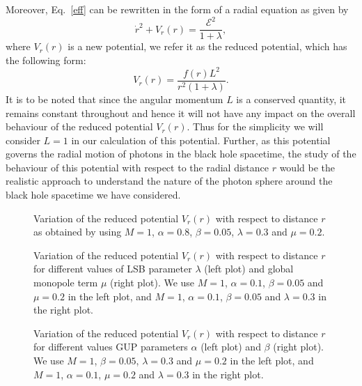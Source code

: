 \documentclass[aps,amsmath,amssymb,showpacs,showkeys]{revtex4}
\begin{document}
Moreover, Eq.\ \eqref{eff} can be rewritten in the form of a radial equation
as given by
\begin{equation}
\dot{r}^2 + V_r(r) = \frac{\mathcal{E}^2}{1+\lambda},
\end{equation}
where $V_r(r)$ is a new potential, we refer it as the reduced potential, which 
has the following form:
\begin{equation}
V_r(r) = \frac{f(r)L^2}{ r^2 (1+\lambda)}.
\end{equation}
It is to be noted that since the angular momentum $L$ is a conserved quantity, 
it remains constant throughout and hence it will not have any impact on the 
overall behaviour of the reduced potential $V_r(r)$. Thus for the 
simplicity we will consider $L=1$ in our calculation of this potential. 
Further, as this potential governs the radial motion of photons in the black 
hole spacetime, the study of the behaviour of this potential with respect to 
the radial distance $r$ would be the realistic approach to understand the 
nature of the photon sphere around the black hole spacetime we have 
considered. 
\begin{figure}[h!]
\vspace{0.2cm}
\caption{Variation of the reduced potential $V_r(r)$ with respect to distance 
$r$ as obtained by using $M=1$, $\alpha=0.8$, $\beta = 0.05$, $\lambda = 0.3$ and 
$\mu=0.2$.}
\label{Shadow00a}
\end{figure}

\begin{figure}[h!]
\caption{Variation of the reduced potential $V_r(r)$ with respect to distance 
$r$ for different values of LSB parameter $\lambda$ (left plot) and global
monopole term $\mu$ (right plot). We use $M=1$, $\alpha=0.1$, 
$\beta = 0.05$ and $\mu=0.2$ in the left plot, and $M=1$, $\alpha=0.1$, 
$\beta = 0.05$ and $\lambda = 0.3$ in the right plot.}
\label{Shadow00b}
\end{figure}

\begin{figure}[h!]
\caption{Variation of the reduced potential $V_r(r)$ with respect to distance 
$r$ for different values GUP parameters $\alpha$ (left plot) and $\beta$ 
(right plot). We use $M=1$, $\beta = 0.05$, $\lambda = 0.3$ and $\mu=0.2$ in 
the left plot, and $M=1$, $\alpha=0.1$, $\mu = 0.2$ and $\lambda = 0.3$ in the right
plot.}
\label{Shadow00c}
\end{figure}
\end{document}
